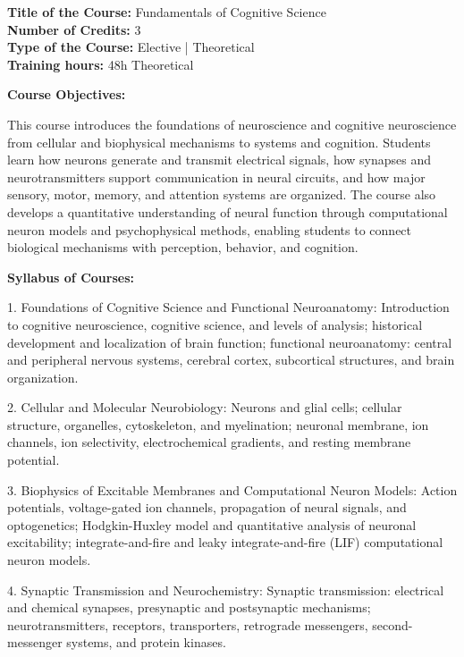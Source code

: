 \documentclass[12pt,a4paper]{article}
\begin{document}
\newpage
\textbf{Title of the Course:} Fundamentals of Cognitive Science\\
\textbf{Number of Credits:} 3\\
\textbf{Type of the Course:} Elective | Theoretical\\
\textbf{Training hours:} 48h Theoretical\par\vspace{4pt}
\textbf{Course Objectives:}\par\vspace{2pt}
This course introduces the foundations of neuroscience and cognitive neuroscience from cellular and biophysical mechanisms to systems and cognition. Students learn how neurons generate and transmit electrical signals, how synapses and neurotransmitters support communication in neural circuits, and how major sensory, motor, memory, and attention systems are organized. The course also develops a quantitative understanding of neural function through computational neuron models and psychophysical methods, enabling students to connect biological mechanisms with perception, behavior, and cognition.\par\vspace{4pt}
\textbf{Syllabus of Courses:}\par\vspace{2pt}
1. Foundations of Cognitive Science and Functional Neuroanatomy: Introduction to cognitive neuroscience, cognitive science, and levels of analysis; historical development and localization of brain function; functional neuroanatomy: central and peripheral nervous systems, cerebral cortex, subcortical structures, and brain organization.\par
2. Cellular and Molecular Neurobiology: Neurons and glial cells; cellular structure, organelles, cytoskeleton, and myelination; neuronal membrane, ion channels, ion selectivity, electrochemical gradients, and resting membrane potential.\par
3. Biophysics of Excitable Membranes and Computational Neuron Models: Action potentials, voltage-gated ion channels, propagation of neural signals, and optogenetics; Hodgkin-Huxley model and quantitative analysis of neuronal excitability; integrate-and-fire and leaky integrate-and-fire (LIF) computational neuron models.\par
4. Synaptic Transmission and Neurochemistry: Synaptic transmission: electrical and chemical synapses, presynaptic and postsynaptic mechanisms; neurotransmitters, receptors, transporters, retrograde messengers, second-messenger systems, and protein kinases.\par
\end{document}
